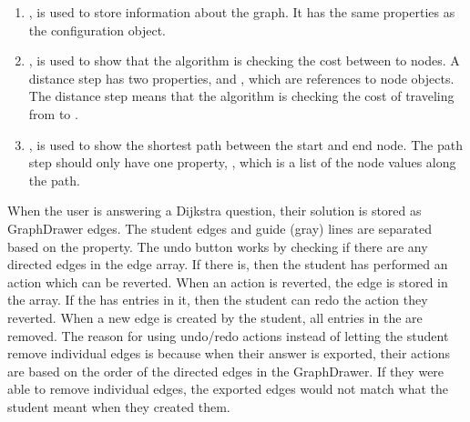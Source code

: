 \begin{enumerate}
    \item {}, is used to store information about the graph. It has the same properties as the  configuration object.
    \item {}, is used to show that the algorithm is checking the cost between to nodes. A distance step has two properties,  and , which are references to node objects. The distance step means that the algorithm is checking the cost of traveling from  to .
    \item {}, is used to show the shortest path between the start and end node. The path step should only have one property, , which is a list of the node values along the path.
\end{enumerate}
When the user is answering a Dijkstra question, their solution is stored as GraphDrawer edges. The student edges and guide (gray) lines are separated based on the  property. The undo button works by checking if there are any directed edges in the edge array. If there is, then the student has performed an action which can be reverted. When an action is reverted, the edge is stored in the  array. If the  has entries in it, then the student can redo the action they reverted. When a new edge is created by the student, all entries in the  are removed. The reason for using undo/redo actions instead of letting the student remove individual edges is because when their answer is exported, their actions are based on the order of the directed edges in the GraphDrawer. If they were able to remove individual edges, the exported edges would not match what the student meant when they created them.